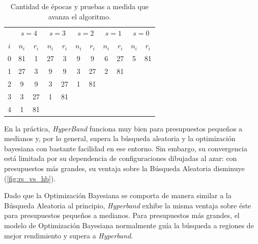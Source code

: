 \documentclass[a4paper,12pt]{article}
\begin{document}
\begin{table}[H]
	\centering
	\begin{tabular}{|l|cc|cc|cc|cc|cc|}
		\hline
		\multicolumn{1}{|c|}{}  & \multicolumn{2}{c|}{$s=4$} & \multicolumn{2}{c|}{$s=3$} & \multicolumn{2}{c|}{$s=2$} & \multicolumn{2}{c|}{$s=1$} & \multicolumn{2}{c|}{$s=0$} \\
		\multicolumn{1}{|c|}{$i$} & $n_i$ & $r_i$ & $n_i$ & $r_i$ & $n_i$ & $r_i$ & $n_i$ & $r_i$ & $n_i$ & $r_i$ \\ \hline
		0                       & 81   & 1    & 27   & 3    & 9    & 9    & 6    & 27   & 5    & 81   \\
		1                       & 27   & 3    & 9    & 9    & 3    & 27   & 2    & 81   &      &      \\
		2                       & 9    & 9    & 3    & 27   & 1    & 81   &      &      &      &      \\
		3                       & 3    & 27   & 1    & 81   &      &      &      &      &      &      \\
		4                       & 1    & 81   &      &      &      &      &      &      &      &      \\ \hline
	\end{tabular}
	\caption{Cantidad de épocas y pruebas a medida que avanza el algoritmo.}
	\label{tab:hyper-epochs-trials}
\end{table}

En la práctica, \textit{HyperBand} funciona muy bien para presupuestos pequeños a medianos y, por lo general, supera la búsqueda aleatoria y la optimización bayesiana con bastante facilidad en ese entorno. Sin embargo, su convergencia está limitada por su dependencia de configuraciones dibujadas al azar: con presupuestos más grandes, su ventaja sobre la Búsqueda Aleatoria disminuye (\ref{fig:rs_vs_hb}).

Dado que la Optimización Bayesiana se comporta de manera similar a la Búsqueda Aleatoria al principio, \textit{Hyperband} exhibe la misma ventaja sobre éste para presupuestos pequeños a medianos. Para presupuestos más grandes, el modelo de Optimización Bayesiana normalmente guía la búsqueda a regiones de mejor rendimiento y supera a \textit{Hyperband}.
\end{document}
